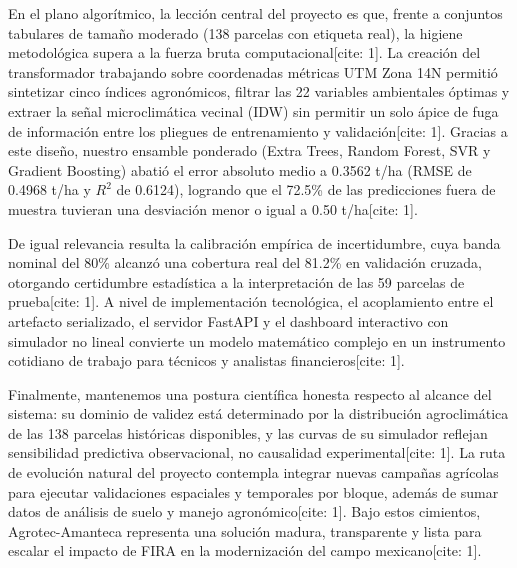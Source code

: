 \documentclass[11pt,a4paper]{article}
\newcommand{\code}[1]{\tcbox[on line, boxsep=1pt, left=3pt, right=3pt, top=1pt, bottom=1pt, colback=mintsoft, colframe=mintsoft, arc=2pt]{\texttt{\footnotesize\color{forestdeep}#1}}}
\begin{document}
En el plano algorítmico, la lección central del proyecto es que, frente a conjuntos tabulares de tamaño moderado (138 parcelas con etiqueta real), la higiene metodológica supera a la fuerza bruta computacional[cite: 1]. La creación del transformador \code{LeakFreeSmartPearsonIDW} trabajando sobre coordenadas métricas UTM Zona 14N permitió sintetizar cinco índices agronómicos, filtrar las 22 variables ambientales óptimas y extraer la señal microclimática vecinal (IDW) sin permitir un solo ápice de fuga de información entre los pliegues de entrenamiento y validación[cite: 1]. Gracias a este diseño, nuestro ensamble ponderado (Extra Trees, Random Forest, SVR y Gradient Boosting) abatió el error absoluto medio a 0.3562 t/ha (RMSE de 0.4968 t/ha y $R^2$ de 0.6124), logrando que el 72.5\% de las predicciones fuera de muestra tuvieran una desviación menor o igual a 0.50 t/ha[cite: 1].

De igual relevancia resulta la calibración empírica de incertidumbre, cuya banda nominal del 80\% alcanzó una cobertura real del 81.2\% en validación cruzada, otorgando certidumbre estadística a la interpretación de las 59 parcelas de prueba[cite: 1]. A nivel de implementación tecnológica, el acoplamiento entre el artefacto serializado, el servidor FastAPI y el dashboard interactivo con simulador no lineal convierte un modelo matemático complejo en un instrumento cotidiano de trabajo para técnicos y analistas financieros[cite: 1].

Finalmente, mantenemos una postura científica honesta respecto al alcance del sistema: su dominio de validez está determinado por la distribución agroclimática de las 138 parcelas históricas disponibles, y las curvas de su simulador reflejan sensibilidad predictiva observacional, no causalidad experimental[cite: 1]. La ruta de evolución natural del proyecto contempla integrar nuevas campañas agrícolas para ejecutar validaciones espaciales y temporales por bloque, además de sumar datos de análisis de suelo y manejo agronómico[cite: 1]. Bajo estos cimientos, Agrotec-Amanteca representa una solución madura, transparente y lista para escalar el impacto de FIRA en la modernización del campo mexicano[cite: 1].

\end{document}

